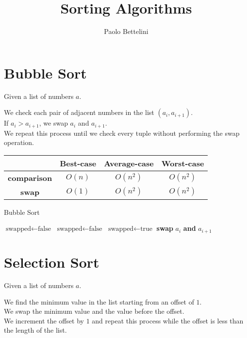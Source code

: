 \documentclass{article}
\title{Sorting Algorithms}
\author{Paolo Bettelini}
\date{}
\begin{document}
\maketitle
\tableofcontents
\pagebreak

\section{Bubble Sort}

Given a list of numbers \(a\).

We check each pair of adjacent numbers in the list \((a_i,a_{i+1})\).\\
If \(a_i>a_{i+1}\), we swap \(a_i\) and \(a_{i+1}\).\\
We repeat this process until we check every tuple without performing the swap operation.

\def\arraystretch{1.5}
\begin{center}
	\begin{tabular}{ |c|c|c|c| }
		\hline
		& \textbf{Best-case} & \textbf{Average-case} &\textbf{Worst-case} \\
		\hline
		\textbf{comparison} & \(O(n)\) & \(O(n^2)\) & \(O(n^2)\) \\ 
		\hline
		\textbf{swap} & \(O(1)\) & \(O(n^2)\) & \(O(n^2)\) \\ 
		\hline
	\end{tabular}
\end{center}

\begin{algorithm}
	\begin{algorithmic}
		\caption{Bubble Sort}
		\State \(\text{swapped}\gets\text{false}\)
		\Do
			\State \(\text{swapped}\gets\text{false}\)
					\State \(\text{swapped}\gets\text{true}\)
					\State \textbf{swap} \(a_i\) \textbf{and} \(a_{i+1}\)
				\EndIf
			\EndFor
	\end{algorithmic}
\end{algorithm}

\pagebreak

\section{Selection Sort}

Given a list of numbers \(a\).

We find the minimum value in the list starting from an offset of \(1\).\\
We swap the minimum value and the value before the offset.\\
We increment the offset by \(1\) and repeat this process while the offset is less than the length of the list.
\end{document}
